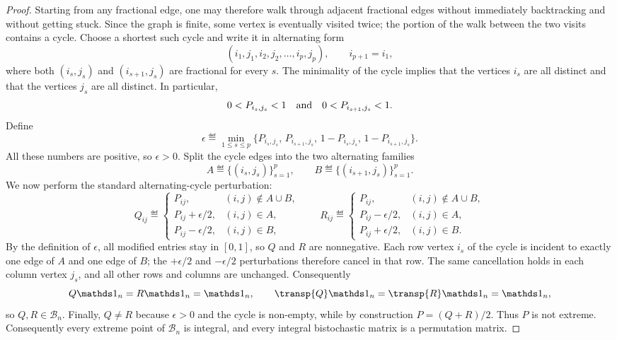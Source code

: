 \begin{proof}
	Starting from any fractional edge, one may therefore walk through adjacent fractional edges without immediately backtracking and without getting stuck. Since the graph is finite, some vertex is eventually visited twice; the portion of the walk between the two visits contains a cycle. Choose a shortest such cycle and write it in alternating form
	\[
		(i_1,j_1,i_2,j_2,\ldots,i_p,j_p),
		\qquad i_{p+1}=i_1 ,
	\]
	where both $(i_s,j_s)$ and $(i_{s+1},j_s)$ are fractional for every $s$. The minimality of the cycle implies that the vertices $i_s$ are all distinct and that the vertices $j_s$ are all distinct. In particular,
	\[
		0<P_{i_s,j_s}<1
		\quad \text{and} \quad
		0<P_{i_{s+1},j_s}<1 .
	\]
	Define
	\[
		\epsilon
		\eqdef
		\min_{1\leq s\leq p}
		\bigl\{
		P_{i_s,j_s},\,
		P_{i_{s+1},j_s},\,
		1-P_{i_s,j_s},\,
		1-P_{i_{s+1},j_s}
		\bigr\}.
	\]
	All these numbers are positive, so $\epsilon>0$. Split the cycle edges into the two alternating families
	\[
		A\eqdef \{(i_s,j_s)\}_{s=1}^p,
		\qquad
		B\eqdef \{(i_{s+1},j_s)\}_{s=1}^p .
	\]
	We now perform the standard alternating-cycle perturbation:
	\[
		Q_{ij}\eqdef
		\begin{cases}
			P_{ij}, & (i,j)\notin A\cup B,\\
			P_{ij}+\epsilon/2, & (i,j)\in A,\\
			P_{ij}-\epsilon/2, & (i,j)\in B,
		\end{cases}
		\qquad
		R_{ij}\eqdef
		\begin{cases}
			P_{ij}, & (i,j)\notin A\cup B,\\
			P_{ij}-\epsilon/2, & (i,j)\in A,\\
			P_{ij}+\epsilon/2, & (i,j)\in B .
		\end{cases}
	\]
	By the definition of $\epsilon$, all modified entries stay in $[0,1]$, so $Q$ and $R$ are nonnegative. Each row vertex $i_s$ of the cycle is incident to exactly one edge of $A$ and one edge of $B$; the $+\epsilon/2$ and $-\epsilon/2$ perturbations therefore cancel in that row. The same cancellation holds in each column vertex $j_s$, and all other rows and columns are unchanged. Consequently
	\[
		Q\ones_n=R\ones_n=\ones_n,
		\qquad
		\transp{Q}\ones_n=\transp{R}\ones_n=\ones_n,
	\]
	so $Q,R\in\mathcal B_n$. Finally, $Q\neq R$ because $\epsilon>0$ and the cycle is non-empty, while by construction $P=(Q+R)/2$. Thus $P$ is not extreme. Consequently every extreme point of $\mathcal B_n$ is integral, and every integral bistochastic matrix is a permutation matrix.
\end{proof}

